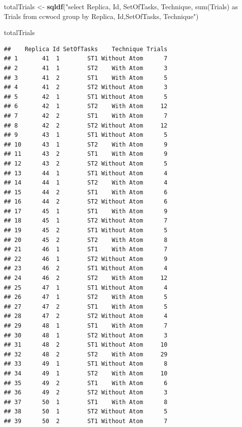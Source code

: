 \documentclass[]{article}
\newenvironment{Shaded}{\begin{snugshade}}{\end{snugshade}}
\newcommand{\KeywordTok}[1]{\textcolor[rgb]{0.13,0.29,0.53}{\textbf{#1}}}
\newcommand{\NormalTok}[1]{#1}
\newcommand{\StringTok}[1]{\textcolor[rgb]{0.31,0.60,0.02}{#1}}
\begin{document}
\begin{Shaded}
\begin{Highlighting}[]
\NormalTok{totalTrials <-}\StringTok{ }\KeywordTok{sqldf}\NormalTok{(}\StringTok{"select Replica, Id, SetOfTasks,}
\StringTok{                      Technique, sum(Trials) as Trials}
\StringTok{                      from ccwocd}
\StringTok{                      group by Replica, Id,SetOfTasks, Technique"}\NormalTok{)}

\NormalTok{totalTrials}
\end{Highlighting}
\end{Shaded}

\begin{verbatim}
##    Replica Id SetOfTasks    Technique Trials
## 1       41  1        ST1 Without Atom      7
## 2       41  1        ST2    With Atom      3
## 3       41  2        ST1    With Atom      5
## 4       41  2        ST2 Without Atom      3
## 5       42  1        ST1 Without Atom      5
## 6       42  1        ST2    With Atom     12
## 7       42  2        ST1    With Atom      7
## 8       42  2        ST2 Without Atom     12
## 9       43  1        ST1 Without Atom      5
## 10      43  1        ST2    With Atom      9
## 11      43  2        ST1    With Atom      9
## 12      43  2        ST2 Without Atom      5
## 13      44  1        ST1 Without Atom      4
## 14      44  1        ST2    With Atom      4
## 15      44  2        ST1    With Atom      6
## 16      44  2        ST2 Without Atom      6
## 17      45  1        ST1    With Atom      9
## 18      45  1        ST2 Without Atom      7
## 19      45  2        ST1 Without Atom      5
## 20      45  2        ST2    With Atom      8
## 21      46  1        ST1    With Atom      7
## 22      46  1        ST2 Without Atom      9
## 23      46  2        ST1 Without Atom      4
## 24      46  2        ST2    With Atom     12
## 25      47  1        ST1 Without Atom      4
## 26      47  1        ST2    With Atom      5
## 27      47  2        ST1    With Atom      5
## 28      47  2        ST2 Without Atom      4
## 29      48  1        ST1    With Atom      7
## 30      48  1        ST2 Without Atom      3
## 31      48  2        ST1 Without Atom     10
## 32      48  2        ST2    With Atom     29
## 33      49  1        ST1 Without Atom      8
## 34      49  1        ST2    With Atom     10
## 35      49  2        ST1    With Atom      6
## 36      49  2        ST2 Without Atom      3
## 37      50  1        ST1    With Atom      8
## 38      50  1        ST2 Without Atom      5
## 39      50  2        ST1 Without Atom      7

\end{verbatim}
\end{document}
